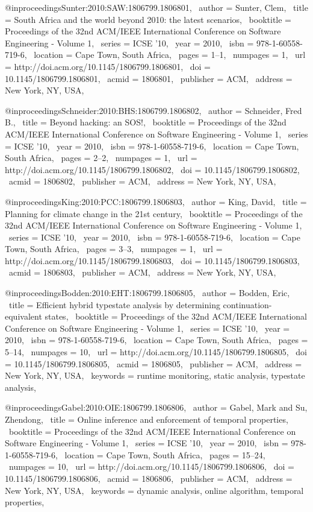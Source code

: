 
@inproceedings{Sunter:2010:SAW:1806799.1806801,
 author = {Sunter, Clem},
 title = {South Africa and the world beyond 2010: the latest scenarios},
 booktitle = {Proceedings of the 32nd ACM/IEEE International Conference on Software Engineering - Volume 1},
 series = {ICSE '10},
 year = {2010},
 isbn = {978-1-60558-719-6},
 location = {Cape Town, South Africa},
 pages = {1--1},
 numpages = {1},
 url = {http://doi.acm.org/10.1145/1806799.1806801},
 doi = {10.1145/1806799.1806801},
 acmid = {1806801},
 publisher = {ACM},
 address = {New York, NY, USA},
} 

@inproceedings{Schneider:2010:BHS:1806799.1806802,
 author = {Schneider, Fred B.},
 title = {Beyond hacking: an SOS!},
 booktitle = {Proceedings of the 32nd ACM/IEEE International Conference on Software Engineering - Volume 1},
 series = {ICSE '10},
 year = {2010},
 isbn = {978-1-60558-719-6},
 location = {Cape Town, South Africa},
 pages = {2--2},
 numpages = {1},
 url = {http://doi.acm.org/10.1145/1806799.1806802},
 doi = {10.1145/1806799.1806802},
 acmid = {1806802},
 publisher = {ACM},
 address = {New York, NY, USA},
} 

@inproceedings{King:2010:PCC:1806799.1806803,
 author = {King, David},
 title = {Planning for climate change in the 21st century},
 booktitle = {Proceedings of the 32nd ACM/IEEE International Conference on Software Engineering - Volume 1},
 series = {ICSE '10},
 year = {2010},
 isbn = {978-1-60558-719-6},
 location = {Cape Town, South Africa},
 pages = {3--3},
 numpages = {1},
 url = {http://doi.acm.org/10.1145/1806799.1806803},
 doi = {10.1145/1806799.1806803},
 acmid = {1806803},
 publisher = {ACM},
 address = {New York, NY, USA},
} 

@inproceedings{Bodden:2010:EHT:1806799.1806805,
 author = {Bodden, Eric},
 title = {Efficient hybrid typestate analysis by determining continuation-equivalent states},
 booktitle = {Proceedings of the 32nd ACM/IEEE International Conference on Software Engineering - Volume 1},
 series = {ICSE '10},
 year = {2010},
 isbn = {978-1-60558-719-6},
 location = {Cape Town, South Africa},
 pages = {5--14},
 numpages = {10},
 url = {http://doi.acm.org/10.1145/1806799.1806805},
 doi = {10.1145/1806799.1806805},
 acmid = {1806805},
 publisher = {ACM},
 address = {New York, NY, USA},
 keywords = {runtime monitoring, static analysis, typestate analysis},
} 

@inproceedings{Gabel:2010:OIE:1806799.1806806,
 author = {Gabel, Mark and Su, Zhendong},
 title = {Online inference and enforcement of temporal properties},
 booktitle = {Proceedings of the 32nd ACM/IEEE International Conference on Software Engineering - Volume 1},
 series = {ICSE '10},
 year = {2010},
 isbn = {978-1-60558-719-6},
 location = {Cape Town, South Africa},
 pages = {15--24},
 numpages = {10},
 url = {http://doi.acm.org/10.1145/1806799.1806806},
 doi = {10.1145/1806799.1806806},
 acmid = {1806806},
 publisher = {ACM},
 address = {New York, NY, USA},
 keywords = {dynamic analysis, online algorithm, temporal properties},
} 

